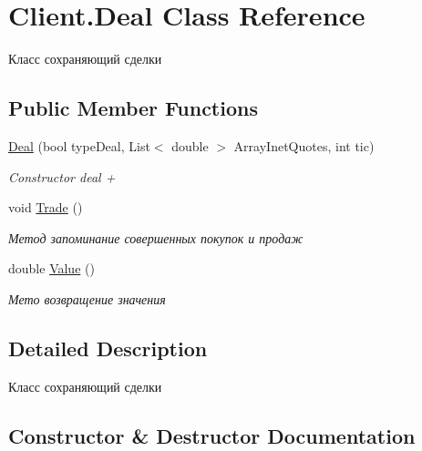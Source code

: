 \hypertarget{class_client_1_1_deal}{}\section{Client.\+Deal Class Reference}
\label{class_client_1_1_deal}


Класс сохраняющий сделки  


\subsection*{Public Member Functions}
\begin{DoxyCompactItemize}
\item 
\hyperlink{class_client_1_1_deal_ac0c16b651799c774f86eaaf1cbe608b2}{Deal} (bool type\+Deal, List$<$ double $>$ Array\+Inet\+Quotes, int tic)
\begin{DoxyCompactList}\small\item\em Constructor deal + \end{DoxyCompactList}\item 
void \hyperlink{class_client_1_1_deal_a18be29256aca8a79b8da771d9c139ecb}{Trade} ()
\begin{DoxyCompactList}\small\item\em Метод запоминание совершенных покупок и продаж \end{DoxyCompactList}\item 
double \hyperlink{class_client_1_1_deal_a6719991014f189438bffe5e5d01f1767}{Value} ()
\begin{DoxyCompactList}\small\item\em Мето возвращение значения \end{DoxyCompactList}\end{DoxyCompactItemize}


\subsection{Detailed Description}
Класс сохраняющий сделки 



\subsection{Constructor \& Destructor Documentation}
\hypertarget{class_client_1_1_deal_ac0c16b651799c774f86eaaf1cbe608b2}{}\label{class_client_1_1_deal_ac0c16b651799c774f86eaaf1cbe608b2} 
